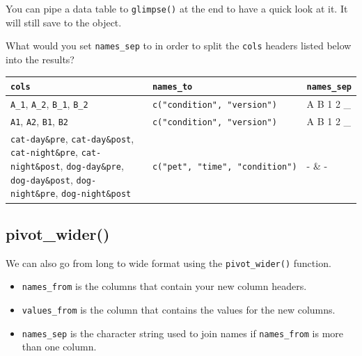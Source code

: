\documentclass[
  oneside]{book}
\providecommand{\tightlist}{%
  \setlength{\itemsep}{0pt}\setlength{\parskip}{0pt}}
\begin{document}
\begin{info}
You can pipe a data table to \texttt{glimpse()} at the end to have a quick look at it. It will still save to the object.

\end{info}

\begin{try}

What would you set \texttt{names\_sep} to in order to split the \texttt{cols} headers listed below into the results?

\begin{longtable}[]{@{}
  >{\raggedright\arraybackslash}p{}
  >{\raggedright\arraybackslash}p{}
  >{\raggedright\arraybackslash}p{}@{}}
\toprule
\texttt{cols} & \texttt{names\_to} & \texttt{names\_sep} \\
\midrule
\endhead
\texttt{A\_1}, \texttt{A\_2}, \texttt{B\_1}, \texttt{B\_2} & \texttt{c("condition",\ "version")} & A B 1 2 \_ \\
\texttt{A1}, \texttt{A2}, \texttt{B1}, \texttt{B2} & \texttt{c("condition",\ "version")} & A B 1 2 \_ \\
\texttt{cat-day\&pre}, \texttt{cat-day\&post}, \texttt{cat-night\&pre}, \texttt{cat-night\&post}, \texttt{dog-day\&pre}, \texttt{dog-day\&post}, \texttt{dog-night\&pre}, \texttt{dog-night\&post} & \texttt{c("pet",\ "time",\ "condition")} & - \& - \\
\bottomrule
\end{longtable}

\end{try}

\hypertarget{pivot_wider}{%
\subsection{pivot\_wider()}\label{pivot_wider}}

We can also go from long to wide format using the \texttt{pivot\_wider()} function.

\begin{itemize}
\tightlist
\item
  \texttt{names\_from} is the columns that contain your new column headers.
\item
  \texttt{values\_from} is the column that contains the values for the new columns.
\item
  \texttt{names\_sep} is the character string used to join names if \texttt{names\_from} is more than one column.
\end{itemize}
\end{document}
